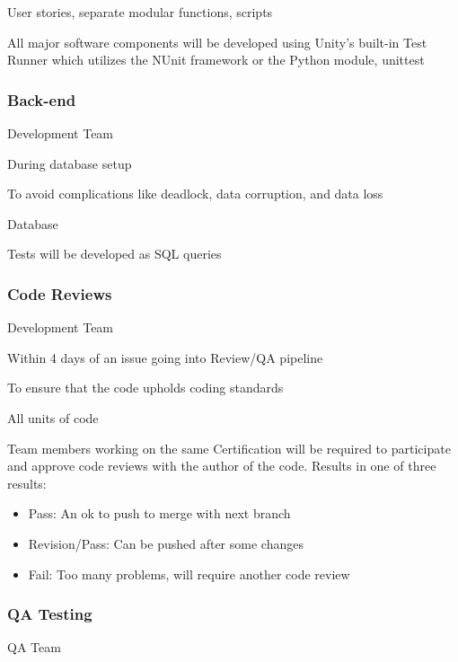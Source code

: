 \documentclass[letterpaper,10pt,english,openany,oneside]{sphinxmanual}
\begin{document}
 User stories, separate modular functions, scripts

 All major software components will be developed using Unity’s built-in Test Runner which utilizes the NUnit framework or the Python module, unittest


\subsubsection{Back-end}
\label{\detokenize{test_plan/strategy:back-end}}
 Development Team

 During database setup

 To avoid complications like deadlock, data corruption, and data loss

 Database

 Tests will be developed as SQL queries


\subsubsection{Code Reviews}
\label{\detokenize{test_plan/strategy:code-reviews}}
 Development Team

 Within 4 days of an issue going into Review/QA pipeline

 To ensure that the code upholds coding standards

 All units of code

 Team members working on the same Certification will be required to participate and approve code reviews with the author of the code. Results in one of three results:
\begin{itemize}
\item {} 
Pass: An ok to push to merge with next branch

\item {} 
Revision/Pass: Can be pushed after some changes

\item {} 
Fail: Too many problems, will require another code review

\end{itemize}


\subsubsection{QA Testing}
\label{\detokenize{test_plan/strategy:qa-testing}}
 QA Team
\end{document}
